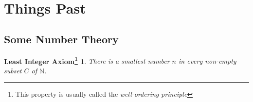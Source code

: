 \documentclass{article}
\newtheorem*{least_integer_axiom}{Least Integer Axiom\footnote{This property is usually called the \textit{well-ordering principle}}}
\begin{document}
    \section{Things Past}
    \subsection{Some Number Theory}
    \begin{least_integer_axiom}
        There is a smallest number \(n\) in every non-empty subset \(C\) of \(\mathbb{N}\).
    \end{least_integer_axiom}
\end{document}
